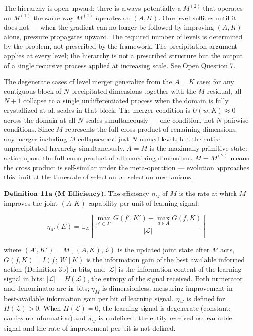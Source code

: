 \documentclass[
]{article}
\begin{document}
The hierarchy is open upward: there is always potentially a \(M^{(2)}\)
that operates on \(M^{(1)}\) the same way \(M^{(1)}\) operates on
\((A, K)\). One level suffices until it does not --- when the gradient
can no longer be followed by improving \((A, K)\) alone, pressure
propagates upward. The required number of levels is determined by the
problem, not prescribed by the framework. The precipitation argument
applies at every level; the hierarchy is not a prescribed structure but
the output of a single recursive process applied at increasing scale.
See Open Question 7.

The degenerate cases of level merger generalize from the \(A = K\) case:
for any contiguous block of \(N\) precipitated dimensions together with
the \(M\) residual, all \(N+1\) collapse to a single undifferentiated
process when the domain is fully crystallized at all scales in that
block. The merger condition is \(U(w, K) \approx 0\) across the domain
at all \(N\) scales simultaneously --- one condition, not \(N\) pairwise
conditions. Since \(M\) represents the full cross product of remaining
dimensions, any merger including \(M\) collapses not just \(N\) named
levels but the entire unprecipitated hierarchy simultaneously. \(A = M\)
is the maximally primitive state: action spans the full cross product of
all remaining dimensions. \(M = M^{(2)}\) means the cross product is
self-similar under the meta-operation --- evolution approaches this
limit at the timescale of selection on selection mechanisms.

\textbf{Definition 11a (M Efficiency).} The efficiency \(\eta_M\) of
\(M\) is the rate at which \(M\) improves the joint \((A, K)\)
capability per unit of learning signal:

\[\eta_M(E) = \mathbb{E}_{\mathcal{L}} \left[ \frac{\max_{a' \in A'} G(f', K') - \max_{a \in A} G(f, K)}{|\mathcal{L}|} \right]\]

where \((A', K') = M((A, K), \mathcal{L})\) is the updated joint state
after \(M\) acts, \(G(f, K) = I(f\,;\, W \mid K)\) is the information
gain of the best available informed action (Definition 3b) in bits, and
\(|\mathcal{L}|\) is the information content of the learning signal in
bits: \(|\mathcal{L}| = H(\mathcal{L})\), the entropy of the signal
received. Both numerator and denominator are in bits; \(\eta_M\) is
dimensionless, measuring improvement in best-available information gain
per bit of learning signal. \(\eta_M\) is defined for
\(H(\mathcal{L}) > 0\). When \(H(\mathcal{L}) = 0\), the learning signal
is degenerate (constant; carries no information) and \(\eta_M\) is
undefined: the entity received no learnable signal and the rate of
improvement per bit is not defined.
\end{document}
